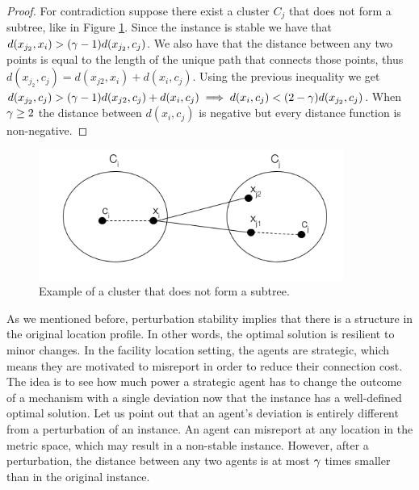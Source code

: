 \begin{proof}
For contradiction suppose there exist a cluster $C_j$ that does not form a subtree, like in Figure \ref{fig:subtree}. Since the instance is stable we have that $d(x_{j_2},x_i)>(\gamma-1)d(x_{j_2},c_j)$. We also have that the distance between any two points is equal to the length of the unique path that connects those points, thus $d(x_{j_2},c_j) = d(x_{j2},x_i) + d(x_i,c_j)$. Using the previous inequality we get $d(x_{j_2},c_j)> (\gamma-1)d(x_{j2},c_j) + d(x_i,c_j) \implies d(x_i,c_j) < (2-\gamma) d(x_{j_2},c_j)$. When $\gamma\ge2$ the distance between $d(x_i,c_j)$ is negative but every distance function is non-negative.
\end{proof}

  
\begin{figure}[ht]
    \centering
    \includegraphics[width=10cm]{Images/FCStableTree.png}
    \caption{Example of a cluster that does not form a subtree.}
    \label{fig:subtree}
\end{figure}



As we mentioned before, perturbation stability implies that there is a structure in the original location profile. In other words, the optimal solution is resilient to minor changes. In the facility location setting, the agents are strategic, which means they are motivated to misreport in order to reduce their connection cost. The idea is to see how much power a strategic agent has to change the outcome of a mechanism with a single deviation now that the instance has a well-defined optimal solution. Let us point out that an agent's deviation is entirely different from a perturbation of an instance. An agent can misreport at any location in the metric space, which may result in a non-stable instance. However, after a perturbation, the distance between any two agents is at most $\gamma$ times smaller than in the original instance. 


